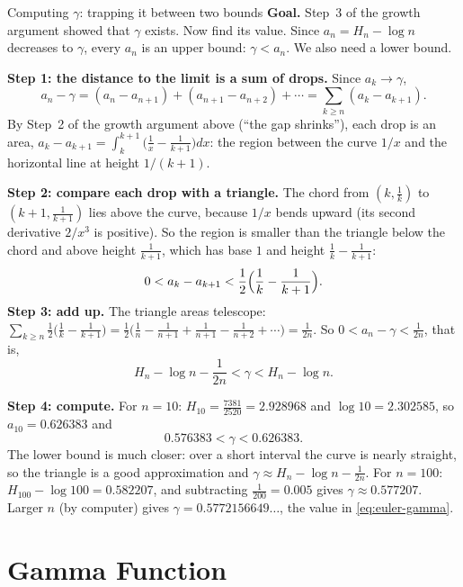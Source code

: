 \documentclass[11pt]{beamer}
\begin{document}
\begin{frame}[allowframebreaks=1.00]{Computing $\gamma$: trapping it between two bounds}
\footnotesize
\textbf{Goal.} Step~3 of the growth argument showed that \(\gamma\) exists. Now find its value. Since \(a_n=H_n-\log n\) decreases to \(\gamma\),
every \(a_n\) is an upper bound: \(\gamma<a_n\). We also need a lower bound.

\textbf{Step 1: the distance to the limit is a sum of drops.} Since \(a_k\to\gamma\),
\[
 a_n-\gamma=(a_n-a_{n+1})+(a_{n+1}-a_{n+2})+\cdots=\sum_{k\ge n}(a_k-a_{k+1}).
\]
By Step~2 of the growth argument above (``the gap shrinks''), each drop is an area,
\(a_k-a_{k+1}=\int_k^{k+1}\bigl(\frac1x-\frac1{k+1}\bigr)dx\): the region between the curve \(1/x\) and the horizontal
line at height \(1/(k+1)\).

\textbf{Step 2: compare each drop with a triangle.} The chord from \((k,\frac1k)\) to \((k+1,\frac1{k+1})\) lies above
the curve, because \(1/x\) bends upward (its second derivative \(2/x^3\) is positive). So the region is
smaller than the triangle below the chord and above height \(\frac1{k+1}\), which has base \(1\) and height
\(\frac1k-\frac1{k+1}\):
\[
 0<a_k-a_{k+1}<\frac12\Bigl(\frac1k-\frac1{k+1}\Bigr).
\]
\textbf{Step 3: add up.} The triangle areas telescope:
\(\sum_{k\ge n}\frac12\bigl(\frac1k-\frac1{k+1}\bigr)=\frac12\bigl(\frac1n-\frac1{n+1}+\frac1{n+1}-\frac1{n+2}+\cdots\bigr)=\frac1{2n}\). So
\(0<a_n-\gamma<\frac1{2n}\), that is,
\begin{equation}
 H_n-\log n-\frac1{2n}<\gamma<H_n-\log n .
 \label{eq:gamma-bounds}
\end{equation}


\textbf{Step 4: compute.} For \(n=10\): \(H_{10}=\frac{7381}{2520}=2.928968\) and \(\log10=2.302585\), so
\(a_{10}=0.626383\) and
\[
 0.576383<\gamma<0.626383 .
\]
The lower bound is much closer: over a short interval the curve is nearly straight, so the triangle
is a good approximation and \(\gamma\approx H_n-\log n-\frac1{2n}\). For \(n=100\): \(H_{100}-\log100=0.582207\), and
subtracting \(\frac1{200}=0.005\) gives \(\gamma\approx0.577207\). Larger \(n\) (by computer) gives
\(\gamma=0.5772156649\ldots\), the value in \eqref{eq:euler-gamma}.
\end{frame}


\section{Gamma Function}
\end{document}
